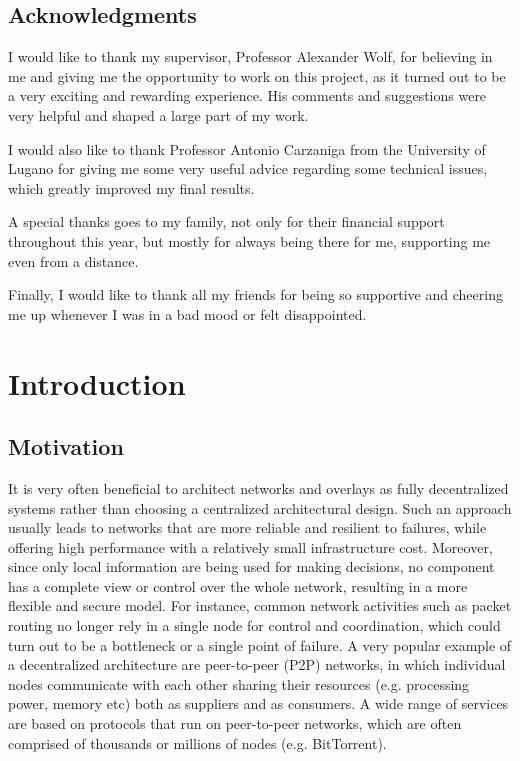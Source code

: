 \documentclass[a4paper,11pt,twoside]{report}
\newcommand{\blankpage}{
\newpage
\thispagestyle{empty}
\mbox{}
\newpage
}
\begin{document}
\blankpage

\thispagestyle{empty}
\section*{Acknowledgments}

I would like to thank my supervisor, Professor Alexander Wolf, for believing in me and giving me the opportunity to work on this project, as it turned out to be a very exciting and rewarding experience.  His comments and suggestions were very helpful and shaped a large part of my work.

I would also like to thank Professor Antonio Carzaniga from the University of Lugano for giving me some very useful advice regarding some technical issues, which greatly improved my final results.

A special thanks goes to my family, not only for their financial support throughout this year, but mostly for always being there for me, supporting me even from a distance.

Finally, I would like to thank all my friends for being so supportive and cheering me up whenever I was in a bad mood or felt disappointed.


\blankpage

\tableofcontents
\listoffigures
\listoftables
\blankpage




\chapter{Introduction}

\section{Motivation}


It is very often beneficial to architect networks and overlays as fully decentralized systems rather than choosing a centralized architectural design. Such an approach usually leads to networks that are more reliable and resilient to failures, while offering high performance with a relatively small infrastructure cost. Moreover, since only local information are being used for making decisions, no component has a complete view or control over the whole network, resulting in a more flexible and secure model. For instance, common network activities such as packet routing no longer rely in a single node for control and coordination, which could turn out to be a bottleneck or a single point of failure. A very popular example of a decentralized architecture are peer-to-peer (P2P) networks, in which individual nodes communicate with each other sharing their resources (e.g. processing power, memory etc) both as suppliers and as consumers. A wide range of services are based on protocols that run on peer-to-peer networks, which are often comprised of thousands or millions of nodes (e.g. BitTorrent).
\end{document}
